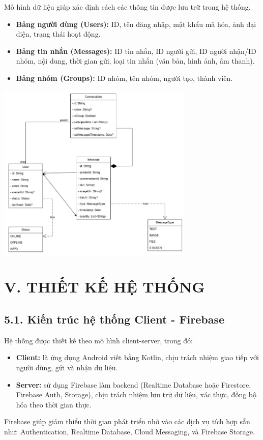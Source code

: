 \documentclass[12pt,a4paper]{article}
\begin{document}
	\noindent
	Mô hình dữ liệu giúp xác định cách các thông tin được lưu trữ trong hệ thống.
	\begin{itemize}
		\item \textbf{Bảng người dùng (Users):} ID, tên đăng nhập, mật khẩu mã hóa, ảnh đại diện, trạng thái hoạt động.
		\item \textbf{Bảng tin nhắn (Messages):} ID tin nhắn, ID người gửi, ID người nhận/ID nhóm, nội dung, thời gian gửi, loại tin nhắn (văn bản, hình ảnh, âm thanh).
		\item \textbf{Bảng nhóm (Groups):} ID nhóm, tên nhóm, người tạo, thành viên.
	\end{itemize}
	\includegraphics[width=0.7\textwidth]{hinhsodo.png}\\[0.5cm]
	\vspace{0.5cm}
	\clearpage
	
	\section*{V. THIẾT KẾ HỆ THỐNG}
	\vspace{0.5cm}
	
	\subsection*{5.1. Kiến trúc hệ thống Client - Firebase}
	\vspace{0.1cm}
	
	\noindent
	Hệ thống được thiết kế theo mô hình client-server, trong đó:
	\begin{itemize}
		\item \textbf{Client:} là ứng dụng Android viết bằng Kotlin, chịu trách nhiệm giao tiếp với người dùng, gửi và nhận dữ liệu.
		\item \textbf{Server:} sử dụng Firebase làm backend (Realtime Database hoặc Firestore, Firebase Auth, Storage), chịu trách nhiệm lưu trữ dữ liệu, xác thực, đồng bộ hóa theo thời gian thực.
	\end{itemize}
	Firebase giúp giảm thiểu thời gian phát triển nhờ vào các dịch vụ tích hợp sẵn như: Authentication, Realtime Database, Cloud Messaging, và Firebase Storage.
	
\end{document}
